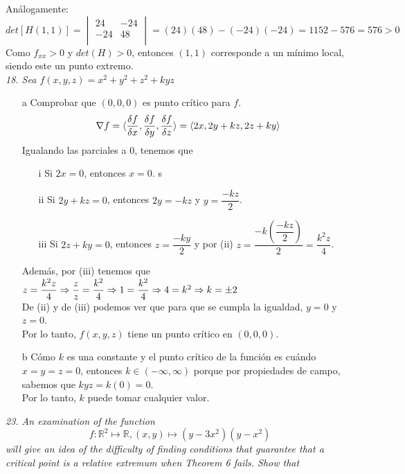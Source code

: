 \documentclass[a4paper,12pt]{article}
\begin{document}
	Análogamente:\\
	$$det [H (1,1)] =
			\begin{vmatrix}
				24 & -24 \\
				-24  & 48 \\
			\end{vmatrix} = (24)(48) -(-24)(-24) = 1152 -576 = 576 > 0
	$$
	Como $f_{xx} > 0$ y $det(H) > 0$, entonces $(1,1)$
	corresponde a un mínimo local, siendo este un punto extremo.\\


\textit{18. Sea $f(x,y,z) = x^2 + y^2 + z^2 + kyz$}
\begin{itemize}
	\item[a] Comprobar que $(0,0,0)$ es punto crítico para $f$.
	$$\nabla f = \langle \dfrac{\delta f}{\delta x}, \dfrac{\delta f}{\delta y}, \dfrac{\delta f}{\delta z}\rangle = \langle 2x, 2y + kz, 2z +ky \rangle$$
	Igualando las parciales a $0$, tenemos que
	\begin{itemize}
		\item[i] Si $2x = 0$, entonces $x = 0$.
	s	\item[ii] Si $2y + kz = 0$, entonces $2y = -kz$ y $y = \dfrac{-kz}{2}$.
		\item[iii] Si $2z + ky = 0$, entonces $z = \dfrac{-ky}{2}$ y por (ii) $z = \dfrac{-k (\dfrac{-kz}{2})}{2} = \dfrac{k^2z}{4}$.
	\end{itemize}
	Además, por (iii) tenemos que $z = \dfrac{k^2z}{4} \Rightarrow \dfrac{z}{z} = \dfrac{k^2}{4} \Rightarrow 1 = \dfrac{k^2}{4} \\ \Rightarrow 4 = k^2 \Rightarrow k = \pm 2$\\
	De (ii) y de (iii) podemos ver que para que se cumpla la igualdad, $y = 0$ y $z = 0$.\\
	Por lo tanto, $f(x,y,z)$ tiene un punto crítico en  $(0,0,0)$.
	\item[b] Cómo $k$ es una constante y el punto crítico de la función es cuándo $x = y = z = 0$, entonces $k \in (-\infty, \infty)$ porque por propiedades de campo, sabemos que $kyz = k(0) = 0$.\\
	Por lo tanto, $k$ puede tomar cualquier valor.\\
\end{itemize}

\textit{23. An examination of the function}
	$$f:\mathbb{R}^2 \mapsto \mathbb{R}, (x, y) \mapsto (y -3x^2)(y -x^2)$$
	\textit{will give an idea of the difficulty of finding conditions that
			guarantee that a critical point is a relative extremum when Theorem
			6 fails. Show that}\\
\end{document}

